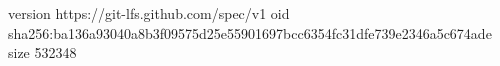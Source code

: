 version https://git-lfs.github.com/spec/v1
oid sha256:ba136a93040a8b3f09575d25e55901697bcc6354fc31dfe739e2346a5c674ade
size 532348

